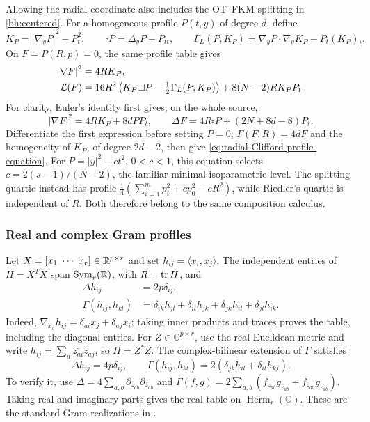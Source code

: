 Allowing the radial coordinate also includes the OT--FKM splitting
in \eqref{bh:centered}. For a homogeneous profile $P(t,y)$ of degree
$d$, define
\[
 K_P=|\nabla_yP|^2-P_t^2,\qquad
 \square P=\Delta_yP-P_{tt},\qquad
 \Gamma_L(P,K_P)=\nabla_yP\cdot\nabla_yK_P-P_t(K_P)_t.
\]
On $F=P(R,p)=0$, the same profile table gives
\begin{align}
 |\nabla F|^2&=4R K_P,\notag\\
 \mathcal L(F)&=16R^2\left(K_P\square P
                  -\tfrac12\Gamma_L(P,K_P)\right)
             +8(N-2)RK_PP_t.
 \label{eq:radial-Clifford-profile-equation}
\end{align}
For clarity, Euler's identity first gives, on the whole source,
\[
 |\nabla F|^2=4RK_P+8dPP_t,\qquad
 \Delta F=4R\square P+(2N+8d-8)P_t.
\]
Differentiate the first expression before setting $P=0$;
$\Gamma(F,R)=4dF$ and the homogeneity of $K_P$, of degree $2d-2$,
then give \eqref{eq:radial-Clifford-profile-equation}.
For $P=|y|^2-ct^2$, $0<c<1$, this equation selects
$c=2(s-1)/(N-2)$, the familiar minimal isoparametric level.
The splitting quartic instead has profile
$\tfrac14(\sum_{i=1}^m p_i^2+cp_0^2-cR^2)$, while Riedler's
quartic is independent of $R$. Both therefore belong to the same
composition calculus.



\subsubsection{Real and complex Gram profiles}

Let $X=[x_1\ \cdots\ x_r]\in\mathbb R^{p\times r}$ and set
$h_{ij}=\langle x_i,x_j\rangle$. The independent entries of
$H=X^TX$ span $\operatorname{Sym}_r(\mathbb R)$, with $R=\operatorname{tr} H$, and
\begin{equation}\label{eq:real-Gram-differential-table}
 \begin{split}
 \Delta h_{ij}&=2p\delta_{ij},\\
 \Gamma(h_{ij},h_{kl})
 &=\delta_{ik}h_{jl}+\delta_{il}h_{jk}
   +\delta_{jk}h_{il}+\delta_{jl}h_{ik}.
 \end{split}
\end{equation}
Indeed, $\nabla_{x_a}h_{ij}=\delta_{ai}x_j+\delta_{aj}x_i$;
taking inner products and traces proves the table, including the
diagonal entries. For $Z\in\mathbb C^{p\times r}$, use the real
Euclidean metric and write
$h_{ij}=\sum_a\overline{z_{ai}}z_{aj}$, so $H=Z^*Z$.
The complex-bilinear extension of $\Gamma$ satisfies
\begin{equation}\label{eq:complex-Gram-differential-table}
 \Delta h_{ij}=4p\delta_{ij},\qquad
 \Gamma(h_{ij},h_{kl})
       =2(\delta_{jk}h_{il}+\delta_{il}h_{kj}).
\end{equation}
To verify it, use $\Delta=4\sum_{a,b}\partial_{z_{ab}}
\partial_{\bar z_{ab}}$ and
$\Gamma(f,g)=2\sum_{a,b}(f_{z_{ab}}g_{\bar z_{ab}}
+f_{\bar z_{ab}}g_{z_{ab}})$. Taking real and imaginary parts
gives the real table on $\operatorname{Herm}_r(\mathbb C)$.
These are the standard Gram realizations in
\cite[Section~3 and Section~7]{MendesRadeschiQuadratic}.

